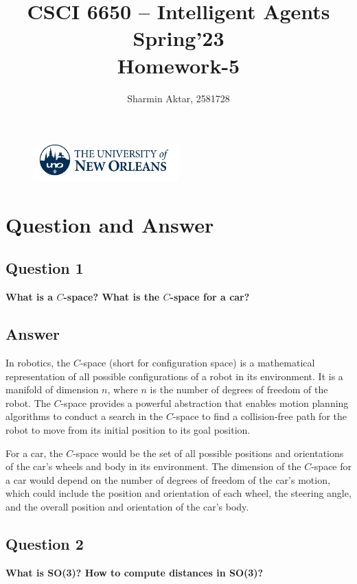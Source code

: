 \documentclass[12]{article}
\title{\textbf{CSCI 6650 – Intelligent Agents\\Spring'23}\\\textbf{Homework-5}}
\author{Sharmin Aktar, 2581728}
\date{}
\begin{document}
\begin{figure}
\centering
\includegraphics[width=0.5\textwidth]{images/uno_logo.png}
\end{figure}

\maketitle

\section*{Question and Answer}

\subsection*{\textbf{Question 1}}
\textbf{What is a $C$-space? What is the $C$-space for a car?}


\subsection*{Answer}

In robotics, the $C$-space (short for configuration space) is a mathematical representation of all possible configurations of a robot in its environment. It is a manifold of dimension $n$, where $n$ is the number of degrees of freedom of the robot. The $C$-space provides a powerful abstraction that enables motion planning algorithms to conduct a search in the $C$-space to find a collision-free path for the robot to move from its initial position to its goal position.

For a car, the $C$-space would be the set of all possible positions and orientations of the car's wheels and body in its environment. The dimension of the $C$-space for a car would depend on the number of degrees of freedom of the car's motion, which could include the position and orientation of each wheel, the steering angle, and the overall position and orientation of the car's body.



\subsection*{\textbf{Question 2}}
\textbf{What is SO(3)? How to compute distances in SO(3)?}
\end{document}
